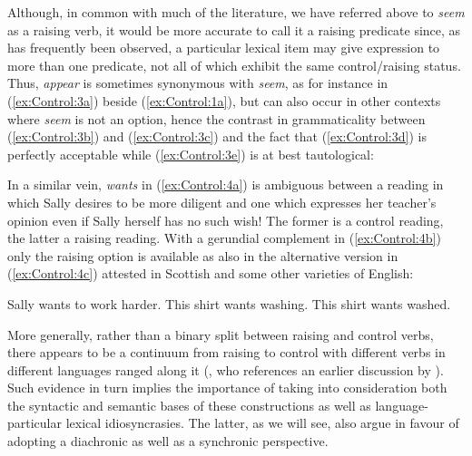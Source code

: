 \documentclass[output=paper,hidelinks]{langscibook}
\begin{document}
Although, in common with much of the literature, we have referred above to \emph{seem} as a raising verb, it would be more accurate to call it a raising predicate since, as has frequently been observed, a particular lexical item may give expression to more than one predicate, not all of which exhibit the same control/raising status. Thus, \emph{appear} is sometimes synonymous with \emph{seem}, as for instance in (\ref{ex:Control:3a}) beside (\ref{ex:Control:1a}), but can also occur in other contexts where \emph{seem} is not an option, hence the contrast in grammaticality between (\ref{ex:Control:3b}) and (\ref{ex:Control:3c}) and the fact that (\ref{ex:Control:3d}) is perfectly acceptable while (\ref{ex:Control:3e}) is at best tautological:

\ea\label{ex:Control:3}
\z\z

\largerpage
In a similar vein, \emph{wants} in (\ref{ex:Control:4a}) is ambiguous between a reading in which Sally desires to be more diligent and one which expresses her teacher's opinion even if Sally herself has no such wish! The former is a control reading, the latter a raising reading. With a gerundial complement in (\ref{ex:Control:4b}) only the raising option is available as also in the alternative version in (\ref{ex:Control:4c}) attested in Scottish and some other varieties of English:

\ea\label{ex:Control:4}
\ea\label{ex:Control:4a} Sally wants to work harder.
\ex\label{ex:Control:4b} This shirt wants washing.
\ex\label{ex:Control:4c} This shirt wants washed.
\z\z\clearpage

\noindent
More generally, rather than a binary split between raising and control verbs, there appears to be a continuum from raising to control with different verbs in different languages ranged along it (\citealt[75--79]{barron2001}, who references an earlier discussion by \citealt{Huddleston1976}). Such evidence in turn implies the importance of taking into consideration both the syntactic and semantic bases of these constructions as well as language-particular lexical idiosyncrasies. The latter, as we will see, also argue in favour of adopting a diachronic as well as a synchronic perspective.
\end{document}

